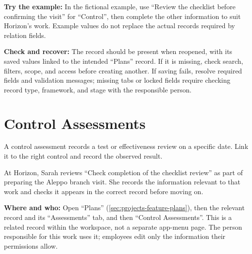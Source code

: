 \textbf{Try the example:} In the fictional example, use “Review the checklist before confirming the visit” for “Control”, then complete the other information to suit Horizon's work. Example values do not replace the actual records required by relation fields.

\textbf{Check and recover:} The record should be present when reopened, with its saved values linked to the intended “Plans” record. If it is missing, check search, filters, scope, and access before creating another. If saving fails, resolve required fields and validation messages; missing tabs or locked fields require checking record type, framework, and stage with the responsible person.

\clearpage
\section{Control Assessments}
\label{sec:projects-feature-planning-control-assessments}

A control assessment records a test or effectiveness review on a specific date. Link it to the right control and record the observed result.

\begin{rcnote}
At Horizon, Sarah reviews “Check completion of the checklist review” as part of preparing the Aleppo branch visit. She records the information relevant to that work and checks it appears in the correct record before moving on.
\end{rcnote}

\textbf{Where and who:} Open “Plans” (\ref{sec:projects-feature-plans}), then the relevant record and its “Assessments” tab, and then “Control Assessments”. This is a related record within the workspace, not a separate app-menu page. The person responsible for this work uses it; employees edit only the information their permissions allow.

